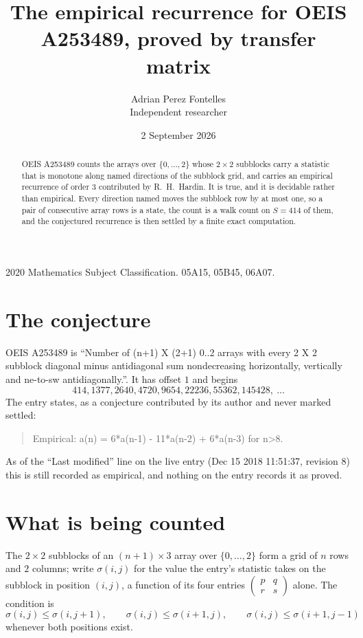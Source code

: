 \documentclass[11pt,a4paper]{article}
\title{The empirical recurrence for OEIS A253489, proved by transfer matrix}
\author{Adrian Perez Fontelles\\ \small Independent researcher}
\date{2 September 2026}
\theoremstyle{plain}
\theoremstyle{definition}
\begin{document}
\maketitle

\begin{abstract}
OEIS A253489 counts the arrays over $\{0,\dots,2\}$ whose $2\times2$ subblocks carry a
statistic that is monotone along named directions of the subblock grid, and carries an
empirical recurrence of order $3$ contributed by R.~H.~Hardin. It is true, and it is
decidable rather than empirical. Every direction named moves the subblock row by at most one,
so a pair of consecutive array rows is a state, the count is a walk count on $S=414$ of them,
and the conjectured recurrence is then settled by a finite exact computation.
\end{abstract}

\noindent\small 2020 Mathematics Subject Classification. 05A15, 05B45, 06A07.\normalsize

\section{The conjecture}

OEIS A253489 is ``Number of (n+1) X (2+1) 0..2 arrays with every 2 X 2 subblock diagonal minus antidiagonal sum nondecreasing horizontally, vertically and ne-to-sw antidiagonally.''. It has offset $1$ and begins
\[
414, 1377, 2640, 4720, 9654, 22236, 55362, 145428,\ \dots
\]
The entry states, as a conjecture contributed by its author and never marked settled:
\begin{quote}
Empirical: a(n) = 6*a(n-1) - 11*a(n-2) + 6*a(n-3) for n>8.
\end{quote}
As of the ``Last modified'' line on the live entry (Dec 15 2018 11:51:37, revision 8) this is still
recorded as empirical, and nothing on the entry records it as proved.

\section{What is being counted}

The $2\times2$ subblocks of an $(n+1)\times3$ array over $\{0,\dots,2\}$ form a grid
of $n$ rows and $2$ columns; write $\sigma(i,j)$ for the value the entry's statistic takes on
the subblock in position $(i,j)$, a function of its four entries
$\begin{pmatrix}p&q\\r&s\end{pmatrix}$ alone. The condition is
\[
\sigma(i,j)\le\sigma(i,j+1),\qquad \sigma(i,j)\le\sigma(i+1,j),\qquad \sigma(i,j)\le\sigma(i+1,j-1)
\]
whenever both positions exist.
\end{document}
